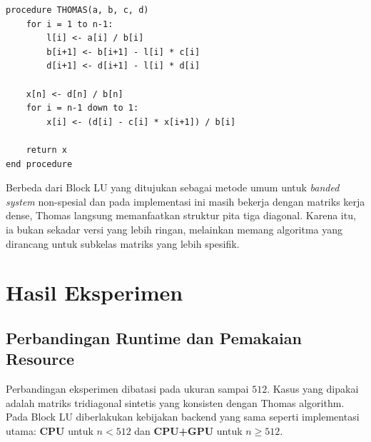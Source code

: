 \documentclass[12pt,a4paper]{article}
\begin{document}
\begin{lstlisting}[style=pseudo,caption={Grand plan Thomas algorithm.},label={lst:thomas}]
procedure THOMAS(a, b, c, d)
    for i = 1 to n-1:
        l[i] <- a[i] / b[i]
        b[i+1] <- b[i+1] - l[i] * c[i]
        d[i+1] <- d[i+1] - l[i] * d[i]

    x[n] <- d[n] / b[n]
    for i = n-1 down to 1:
        x[i] <- (d[i] - c[i] * x[i+1]) / b[i]

    return x
end procedure
\end{lstlisting}

Berbeda dari Block LU yang ditujukan sebagai metode umum untuk \emph{banded system} non-spesial dan pada implementasi ini masih bekerja dengan matriks kerja dense, Thomas langsung memanfaatkan struktur pita tiga diagonal. Karena itu, ia bukan sekadar versi yang lebih ringan, melainkan memang algoritma yang dirancang untuk subkelas matriks yang lebih spesifik.

\section{Hasil Eksperimen}
\subsection{Perbandingan Runtime dan Pemakaian Resource}
Perbandingan eksperimen dibatasi pada ukuran sampai $512$. Kasus yang dipakai adalah matriks tridiagonal sintetis yang konsisten dengan Thomas algorithm. Pada Block LU diberlakukan kebijakan backend yang sama seperti implementasi utama: \textbf{CPU} untuk $n<512$ dan \textbf{CPU+GPU} untuk $n\geq512$.

\begin{table}[h]
\centering
\caption{Perbandingan runtime dan peak memory inti algoritma antara Block LU dan Thomas algorithm.}
\label{tab:runtime-memory}
\end{table}
\end{document}
